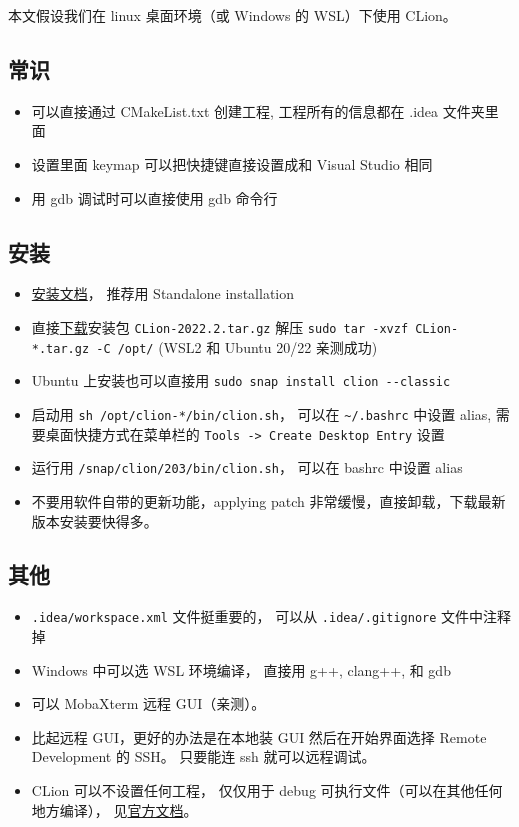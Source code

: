 
\begin{issues}
\issueDraft
\end{issues}

本文假设我们在 linux 桌面环境（或 Windows 的 WSL）下使用 CLion。

\subsection{常识}
\begin{itemize}
\item 可以直接通过 CMakeList.txt 创建工程, 工程所有的信息都在 .idea 文件夹里面
\item 设置里面 keymap 可以把快捷键直接设置成和 Visual Studio 相同
\item 用 gdb 调试时可以直接使用 gdb 命令行
\end{itemize}

\subsection{安装}
\begin{itemize}
\item \href{https://www.jetbrains.com/help/clion/installation-guide.html}{安装文档}， 推荐用 Standalone installation
\item 直接\href{https://www.jetbrains.com/clion/download/#section=linux}{下载}安装包 \verb`CLion-2022.2.tar.gz` 解压 \verb`sudo tar -xvzf CLion-*.tar.gz -C /opt/` (WSL2 和 Ubuntu 20/22 亲测成功)
\item Ubuntu 上安装也可以直接用 \verb`sudo snap install clion --classic`
\item  启动用 \verb`sh /opt/clion-*/bin/clion.sh`， 可以在 \verb`~/.bashrc` 中设置 alias, 需要桌面快捷方式在菜单栏的 \verb`Tools -> Create Desktop Entry` 设置
\item 运行用 \verb`/snap/clion/203/bin/clion.sh`， 可以在 bashrc 中设置 alias
\item 不要用软件自带的更新功能，applying patch 非常缓慢，直接卸载，下载最新版本安装要快得多。
\end{itemize}


\subsection{其他}
\begin{itemize}
\item \verb`.idea/workspace.xml` 文件挺重要的， 可以从 \verb`.idea/.gitignore` 文件中注释掉
\item Windows 中可以选 WSL 环境编译， 直接用 g++, clang++, 和 gdb
\item 可以 MobaXterm 远程 GUI（亲测）。
\item 比起远程 GUI，更好的办法是在本地装 GUI 然后在开始界面选择 Remote Development 的 SSH。 只要能连 ssh 就可以远程调试。


\item CLion 可以不设置任何工程， 仅仅用于 debug 可执行文件（可以在其他任何地方编译）， 见\href{https://www.jetbrains.com/help/clion/debug-arbitrary-executable.html}{官方文档}。
\end{itemize}

